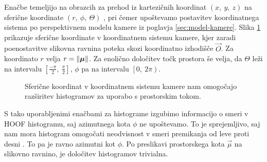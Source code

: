 Enačbe temeljijo na obrazcih za prehod iz kartezičnih koordinat $(x, ~y, ~z)$ na sferične koordinate $(r,~\phi,~\Theta)$ \cite{bronstein1990math}, pri čemer upoštevamo postavitev koordinatnega sistema po perspektivnem modelu kamere iz poglavja \ref{sec:model-kamere}. Slika \ref{fig:sphere} prikazuje sferične koordinate v koordinatnem sistemu kamere, kjer zaradi poenostavitve slikovna ravnina poteka skozi koordinatno izhodišče $\vec{O}$. Za koordinato $r$ velja $r=\left\lVert {\boldsymbol{\mu}} \right\rVert$. Za enolično določitev točk prostora še velja, da $\Theta$ leži na intervalu $\left[\frac{-\pi}{2},~\frac{\pi}{2}\right]$, $\phi$ pa na intervalu $\left[0,~2\pi\right)$.

\begin{figure}[htb]
	\centering
	
	\caption[Sferične koordinate v koordinatnem sistemu kamere]{Sferične koordinat v koordinatnem sistemu kamere nam omogočajo razširitev histogramov za uporabo s prostorskim tokom.}
	\label{fig:sphere}
\end{figure}

S tako uporabljenimi enačbami za histograme izgubimo informacijo o smeri v HOOF histogramu, saj azimutnega kota $\phi$ ne upoštevamo. To je sprejemljivo, saj nam mora histogram omogočati neodvisnost v smeri premikanja od leve proti desni \cite{chaudhry2009histograms}. To pa je ravno azimutni kot $\phi$. Po preslikavi prostorskega kota $\vec{\mu}$ na slikovno ravnino, je določitev histogramov trivialna. 
